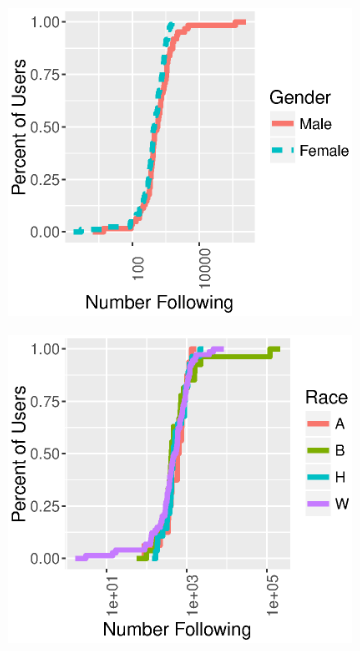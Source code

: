 \begin{figure}[t]
  \begin{subfigure}[b]{.21\textwidth}
    \centering
    \includegraphics[width=\linewidth]{fig/census/following_cdf_gender.eps}
    \caption{}
    \label{fig:following_cdf_gender}
  \end{subfigure}
  \begin{subfigure}[b]{.21\textwidth}
    \centering
    \includegraphics[width=\linewidth]{fig/census/following_cdf_race.eps}
    \caption{}
    \label{fig:following_cdf_race}
  \end{subfigure}
  \caption{}
  \label{fig:follow_cdf}
\end{figure}

